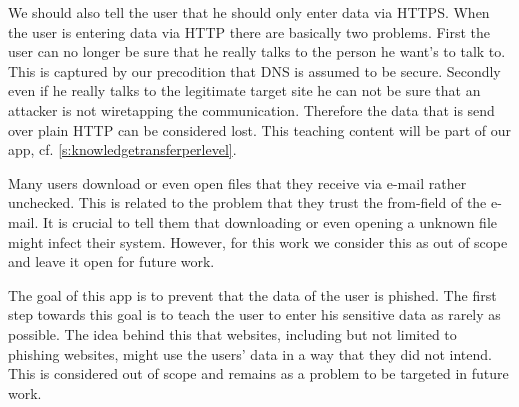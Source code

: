 \begin{description}[leftmargin=0cm]
	\item[Data Entry Via Https] We should also tell the user that he should only enter data via HTTPS. 
	When the user is entering data via HTTP there are basically two problems.
	First the user can no longer be sure that he really talks to the person he want's to talk to.
	This is captured by our precodition that DNS is assumed to be secure.
	Secondly even if he really talks to the legitimate target site he can not be sure that an attacker is not wiretapping the communication.
	Therefore the data that is send over plain HTTP can be considered lost.
	This teaching content will be part of our app, cf. \autoref{s:knowledgetransferperlevel}.	
	\item[Do Not Download Attachments] Many users download or even open files that they receive via e-mail rather unchecked.
	This is related to the problem that they trust the from-field of the e-mail.
	It is crucial to tell them that downloading or even opening a unknown file might infect their system.
	However, for this work we consider this as out of scope and leave it open for future work.
	\item[Data Economy] The goal of this app is to prevent that the data of the user is phished.
	The first step towards this goal is to teach the user to enter his sensitive data as rarely as possible.
	The idea behind this that websites, including but not limited to phishing websites, might use the users' data in a way that they did not intend. 
	This is considered out of scope and remains as a problem to be targeted in future work.
\end{description}

